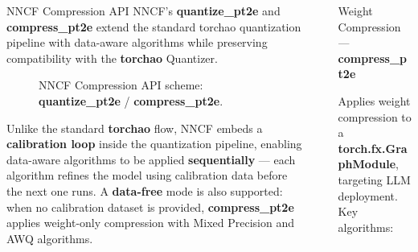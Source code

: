 \documentclass[final]{beamer}
\newlength{\sepwidth}
\newlength{\colwidth}
\newcommand{\separatorcolumn}{\begin{column}{\sepwidth}\end{column}}
\begin{document}
\begin{frame}[t]
\begin{columns}[t]
\begin{column}{\colwidth}
\begin{block}{NNCF Compression API}
        NNCF's \textbf{quantize\_pt2e} and \textbf{compress\_pt2e} extend the standard torchao quantization pipeline with data-aware algorithms while preserving compatibility with the \textbf{torchao} Quantizer.

        \begin{figure}
          \centering
          
          \caption{NNCF Compression API scheme: \textbf{quantize\_pt2e} / \textbf{compress\_pt2e}.}
        \end{figure}

        Unlike the standard \textbf{torchao} flow, NNCF embeds a \textbf{calibration loop} inside the quantization pipeline, enabling data-aware algorithms to be applied \textbf{sequentially} --- each algorithm refines the model using calibration data before the next one runs.
        A \textbf{data-free} mode is also supported: when no calibration dataset is provided, \textbf{compress\_pt2e} applies weight-only compression with Mixed Precision and AWQ algorithms.

      \end{block}


    \end{column}

    \separatorcolumn

    \begin{column}{\colwidth}

      \begin{block}{Weight Compression --- \textbf{compress\_pt2e}}

        \heading{}

        Applies weight compression to a \textbf{torch.fx.GraphModule}, targeting LLM deployment. Key algorithms:


\end{block}
\end{column}
\end{columns}
\end{frame}
\end{document}

